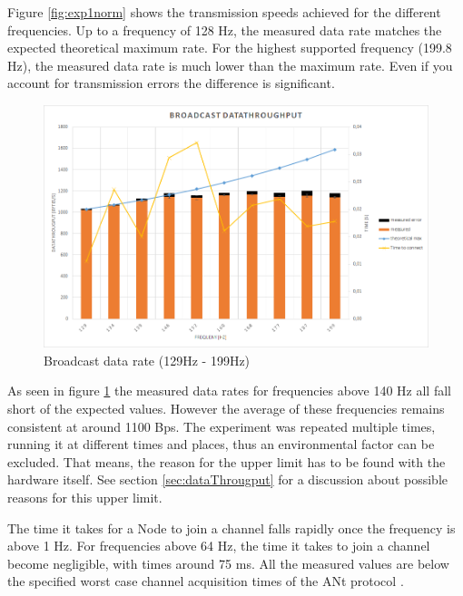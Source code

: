 \begin{description}
	Figure \ref{fig:exp1norm} shows the transmission speeds achieved for the different frequencies. Up to a frequency of 128 Hz, the measured data rate matches the expected theoretical maximum rate. For the highest supported frequency (199.8 Hz), the measured data rate is much lower than the maximum rate. Even if you account for transmission errors the difference is significant. 
		\begin{figure}[H]
			\centering
			\includegraphics[scale=0.5]{./pics/exp1_detail.png}
			\caption{Broadcast data rate (129Hz - 199Hz)}\label{fig:exp1between}
		\end{figure}
	As seen in figure \ref{fig:exp1between} the measured data rates for frequencies above 140 Hz all fall short of the expected values. However the average of these frequencies remains consistent at around 1100 Bps. The experiment was repeated multiple times, running it at different times and places, thus an environmental factor can be excluded. That means, the reason for the upper limit has to be found with the hardware itself. See section \ref{sec:dataThrougput} for a discussion about possible reasons for this upper limit.
	
	The time it takes for a Node to join a channel falls rapidly once the frequency is above 1 Hz. For frequencies above 64 Hz, the time it takes to join a channel become negligible, with times around 75 ms. All the measured values are below the specified worst case channel acquisition times of the ANt protocol \cite{AntChan}.
	

\end{description}
